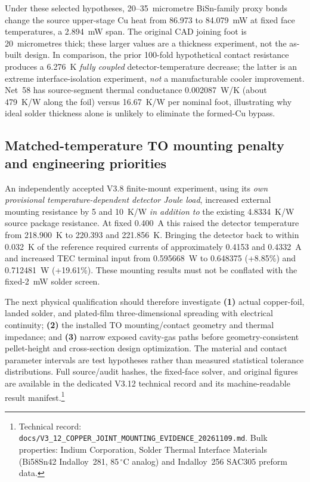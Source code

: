 Under these selected hypotheses, 20--35~micrometre BiSn-family proxy bonds change the source upper-stage Cu heat from 86.973 to 84.079~mW at fixed face temperatures, a 2.894~mW span. The original CAD joining foot is 20~micrometres thick; these larger values are a thickness experiment, not the as-built design. In comparison, the prior 100-fold hypothetical contact resistance produces a 6.276~K \emph{fully coupled} detector-temperature decrease; the latter is an extreme interface-isolation experiment, \emph{not} a manufacturable cooler improvement. Net~58 has source-segment thermal conductance 0.002087~W/K (about 479~K/W along the foil) versus 16.67~K/W per nominal foot, illustrating why ideal solder thickness alone is unlikely to eliminate the formed-Cu bypass.

\subsection{Matched-temperature TO mounting penalty and engineering priorities}
An independently accepted V3.8 finite-mount experiment, using its \emph{own provisional temperature-dependent detector Joule load}, increased external mounting resistance by 5 and 10~K/W \emph{in addition to} the existing 4.8334~K/W source package resistance. At fixed 0.400~A this raised the detector temperature from 218.900~K to 220.393 and 221.856~K. Bringing the detector back to within 0.032~K of the reference required currents of approximately 0.4153 and 0.4332~A and increased TEC terminal input from 0.595668~W to 0.648375 (+8.85\%) and 0.712481~W (+19.61\%). These mounting results must not be conflated with the fixed-2~mW solder screen.

The next physical qualification should therefore investigate \textbf{(1)} actual copper-foil, landed solder, and plated-film three-dimensional spreading with electrical continuity; \textbf{(2)} the installed TO mounting/contact geometry and thermal impedance; and \textbf{(3)} narrow exposed cavity-gas paths before geometry-consistent pellet-height and cross-section design optimization. The material and contact parameter intervals are test hypotheses rather than measured statistical tolerance distributions. Full source/audit hashes, the fixed-face solver, and original figures are available in the dedicated V3.12 technical record and its machine-readable result manifest.\footnote{Technical record: \texttt{docs/V3\_12\_COPPER\_JOINT\_MOUNTING\_EVIDENCE\_20261109.md}. Bulk properties: Indium Corporation, Solder Thermal Interface Materials (Bi58Sn42 Indalloy~281, 85\,$^\circ$C analog) and Indalloy~256 SAC305 preform data.}
